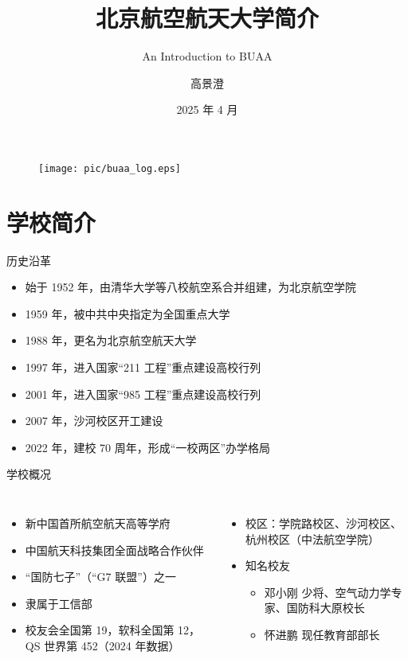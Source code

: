 \documentclass[
    12pt,
    aspectratio=169
]{beamer}
\title{北京航空航天大学简介}
\subtitle{An Introduction to BUAA}
\author{高景澄}
\date{2025 年 4 月}
\institute{synzwmb83@outlook.com}
\begin{document}
\begin{frame}
    \titlepage
    \begin{figure}[htpb]
        \begin{center}
            \texttt{[image: pic/buaa\_log.eps]}
        \end{center}
    \end{figure}
\end{frame}

\section{学校简介}

\begin{frame}{历史沿革}
    \begin{itemize}
        \item 始于 1952 年，由清华大学等八校航空系合并组建，为北京航空学院
        \item 1959 年，被中共中央指定为全国重点大学
        \item 1988 年，更名为北京航空航天大学
        \item 1997 年，进入国家“211 工程”重点建设高校行列
        \item 2001 年，进入国家“985 工程”重点建设高校行列
        \item 2007 年，沙河校区开工建设
        \item 2022 年，建校 70 周年，形成“一校两区”办学格局
    \end{itemize}
\end{frame}

\begin{frame}{学校概况}
    \begin{columns}[T]
            \begin{itemize}[<+->]
                \rmfamily
                \item 新中国首所航空航天高等学府
                \item 中国航天科技集团全面战略合作伙伴
                \item “国防七子”（“G7 联盟”）之一
                \item 隶属于工信部
                \item 校友会全国第 19，软科全国第 12，QS 世界第 452（2024 年数据）
            \end{itemize}    
            \begin{itemize}[<+->]
                \rmfamily
                \item 校区：学院路校区、沙河校区、杭州校区（中法航空学院）
                \item 知名校友
                    \begin{itemize}[<+->]
                        \item 邓小刚 \ttfamily 少将、空气动力学专家、国防科大原校长
                        \item 怀进鹏 \ttfamily 现任教育部部长
                    \end{itemize}
            \end{itemize}
    \end{columns}
\end{frame}
\end{document}
